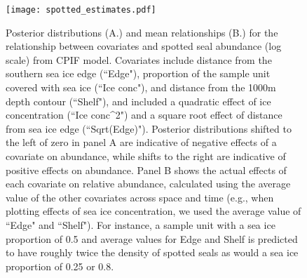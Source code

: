 \documentclass[times,mee,doublespace,]{besauth2}
\begin{document}
\begin{figure}
\begin{center}
\texttt{[image: spotted\_estimates.pdf]}
\caption{Posterior distributions (A.) and mean relationships (B.) for the relationship between covariates and spotted seal abundance (log scale) from CPIF model.  Covariates include distance from the southern sea ice edge (``Edge"), proportion of the sample unit covered with sea ice (``Ice conc"), and distance from the 1000m depth contour (``Shelf"), and included a quadratic effect of ice concentration (``Ice conc\string^2") and a square root effect of distance from sea ice edge (``Sqrt(Edge)"). Posterior distributions shifted to the left of zero in panel A are indicative of negative effects of a covariate on abundance, while shifts to the right are indicative of positive effects on abundance.  Panel B shows the actual effects of each covariate on relative abundance, calculated using the average value of the other covariates across space and time (e.g., when plotting effects of sea ice concentration, we used the average value of ``Edge" and ``Shelf").  For instance, a sample unit with a sea ice proportion of 0.5 and average values for Edge and Shelf is predicted to have roughly twice the density of spotted seals as would a sea ice proportion of 0.25 or 0.8.}
\label{fig:spotted_covs}
\end{center}
\end{figure}
\end{document}
